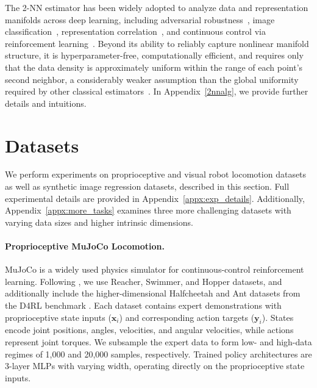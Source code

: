 \documentclass{article}
\newcommand{\by}{{\mathbf y}}
\newcommand{\bx}{{\mathbf x}}
\theoremstyle{plain}
\theoremstyle{definition}
\theoremstyle{remark}
\begin{document}
The 2-NN estimator has been widely adopted to analyze data and representation manifolds across deep learning, including adversarial robustness~\citep{ma2018characterizing}, image classification~\citep{ansuini2019intrinsic, pope2021intrinsic}, representation correlation~\citep{basile2025id_correlation}, and continuous control via reinforcement learning~\citep{tiwari2025rl_geometry}. Beyond its ability to reliably capture nonlinear manifold structure, it is hyperparameter-free, computationally efficient, and requires only that the data density is approximately uniform within the range of each point's second neighbor, a considerably weaker assumption than the global uniformity required by other classical estimators~\citep{levina2004maximum}. In Appendix~\ref{2nnalg}, we provide further details and intuitions.


\section{Datasets} \label{sec:datasets}
We perform experiments on proprioceptive and visual robot locomotion datasets as well as synthetic image regression datasets, described in this section. Full experimental details are provided in Appendix~\ref{appx:exp_details}. Additionally, Appendix~\ref{appx:more_tasks} examines three more challenging datasets with varying data sizes and higher intrinsic dimensions.



\paragraph{Proprioceptive MuJoCo Locomotion.} 
MuJoCo \citep{brockman2016openai, towers_gymnasium_2023} is a widely used physics simulator for continuous-control reinforcement learning. Following \citet{andriopoulos2024prevalence}, we use Reacher, Swimmer, and Hopper datasets, and additionally include the higher-dimensional Halfcheetah and Ant datasets from the D4RL benchmark \citep{fu2020d4rl}. Each dataset contains expert demonstrations with proprioceptive state inputs ($\bx_i$) and corresponding action targets ($\by_i$). States encode joint positions, angles, velocities, and angular velocities, while actions represent joint torques. We subsample the expert data to form low- and high-data regimes of 1,000 and 20,000 samples, respectively. Trained policy architectures are 3-layer MLPs with varying width, operating directly on the proprioceptive state inputs.
\end{document}
